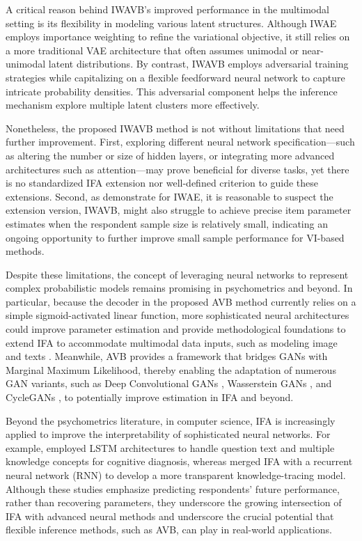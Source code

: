 \documentclass[a4paper,12pt]{article}
\theoremstyle{plain} %
\theoremstyle{remark} %
\theoremstyle{definition} %
\begin{document}
A critical reason behind IWAVB's improved performance in the multimodal setting is its flexibility in modeling various latent structures. Although IWAE employs importance weighting to refine the variational objective, it still relies on a more traditional VAE architecture that often assumes unimodal or near-unimodal latent distributions. By contrast, IWAVB employs adversarial training strategies while capitalizing on a flexible feedforward neural network to capture intricate probability densities. This adversarial component helps the inference mechanism explore multiple latent clusters more effectively.

Nonetheless, the proposed IWAVB method is not without limitations that need further improvement. First, exploring different neural network specification---such as altering the number or size of hidden layers, or integrating more advanced architectures such as attention---may prove beneficial for diverse tasks, yet there is no standardized IFA extension nor well-defined criterion to guide these extensions. Second, as \citet{ma2024note} demonstrate for IWAE, it is reasonable to suspect the extension version, IWAVB, might also struggle to achieve precise item parameter estimates when the respondent sample size is relatively small, indicating an ongoing opportunity to further improve small sample performance for VI-based methods.

Despite these limitations, the concept of leveraging neural networks to represent complex probabilistic models remains promising in psychometrics and beyond. In particular, because the decoder in the proposed AVB method currently relies on a simple sigmoid-activated linear function, more sophisticated neural architectures could improve parameter estimation and provide methodological foundations to extend IFA to accommodate multimodal data inputs, such as modeling image and texts \citep{cheng2019dirt}. Meanwhile, AVB provides a framework that bridges GANs with Marginal Maximum Likelihood, thereby enabling the adaptation of numerous GAN variants, such as Deep Convolutional GANs \citep{radford2015unsupervised}, Wasserstein GANs \citep{arjovsky2017wasserstein}, and CycleGANs \citep{zhu2017unpaired}, to potentially improve estimation in IFA and beyond.

Beyond the psychometrics literature, in computer science, IFA is increasingly applied to improve the interpretability of sophisticated neural networks. For example, \citet{cheng2019dirt} employed LSTM architectures to handle question text and multiple knowledge concepts for cognitive diagnosis, whereas \citet{yeung2019deep} merged IFA with a recurrent neural network (RNN) to develop a more transparent knowledge-tracing model. Although these studies emphasize predicting respondents’ future performance, rather than recovering parameters, they underscore the growing intersection of IFA with advanced neural methods and underscore the crucial potential that flexible inference methods, such as AVB, can play in real-world applications. 
\end{document}
